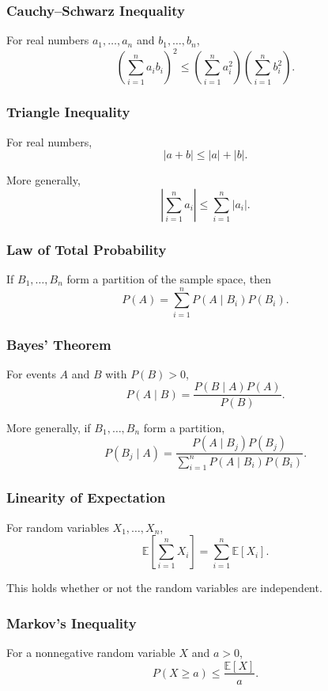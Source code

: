 \documentclass[11pt]{article}
\begin{document}
\subsubsection{Cauchy--Schwarz Inequality}

For real numbers $a_1,\ldots,a_n$ and $b_1,\ldots,b_n$,
\[
\left(\sum_{i=1}^n a_i b_i\right)^2
\leq
\left(\sum_{i=1}^n a_i^2\right)
\left(\sum_{i=1}^n b_i^2\right).
\]

\subsubsection{Triangle Inequality}

For real numbers,
\[
|a+b|\leq |a|+|b|.
\]

More generally,
\[
\left|\sum_{i=1}^n a_i\right|
\leq
\sum_{i=1}^n |a_i|.
\]

\subsubsection{Law of Total Probability}

If $B_1,\ldots,B_n$ form a partition of the sample space, then
\[
P(A)
=
\sum_{i=1}^n P(A\mid B_i)P(B_i).
\]

\subsubsection{Bayes' Theorem}

For events $A$ and $B$ with $P(B)>0$,
\[
P(A\mid B)
=
\frac{P(B\mid A)P(A)}{P(B)}.
\]

More generally, if $B_1,\ldots,B_n$ form a partition,
\[
P(B_j\mid A)
=
\frac{P(A\mid B_j)P(B_j)}
{\sum_{i=1}^nP(A\mid B_i)P(B_i)}.
\]

\subsubsection{Linearity of Expectation}

For random variables $X_1,\ldots,X_n$,
\[
\mathbb E\left[\sum_{i=1}^nX_i\right]
=
\sum_{i=1}^n\mathbb E[X_i].
\]

This holds whether or not the random variables are independent.

\subsubsection{Markov's Inequality}

For a nonnegative random variable $X$ and $a>0$,
\[
P(X\geq a)
\leq
\frac{\mathbb E[X]}{a}.
\]
\end{document}
